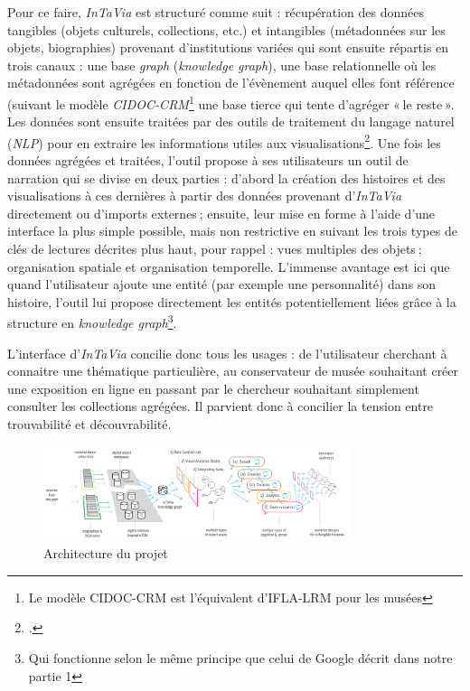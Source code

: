 Pour ce faire, \textit{InTaVia} est structuré comme suit : récupération des données tangibles (objets culturels, collections, etc.) et intangibles (métadonnées sur les objets, biographies) provenant d’institutions variées qui sont ensuite répartis en trois canaux : une base \textit{graph} (\textit{knowledge graph}), une base relationnelle où les métadonnées sont agrégées en fonction de l’évènement auquel elles font référence (suivant le modèle \textit{CIDOC-CRM}\footnote{Le modèle CIDOC-CRM est l'équivalent d'IFLA-LRM pour les musées} une base tierce qui tente d’agréger « le reste ». Les données sont ensuite traitées par des outils de traitement du langage naturel (\textit{NLP}) pour en extraire les informations utiles aux visualisations\footcite{noauthor_overall_nodate}. Une fois les données agrégées et traitées, l’outil propose à ses utilisateurs un outil de narration qui se divise en deux parties : d’abord la création des histoires et des visualisations à ces dernières à partir des données provenant d’\textit{InTaVia} directement ou d’imports externes ; ensuite, leur mise en forme à l’aide d’une interface la plus simple possible, mais non restrictive en suivant les trois types de clés de lectures décrites plus haut, pour rappel : vues multiples des objets ; organisation spatiale et organisation temporelle. L’immense avantage est ici que quand l’utilisateur ajoute une entité (par exemple une personnalité) dans son histoire, l’outil lui propose directement les entités potentiellement liées grâce à la structure en \textit{knowledge graph}\footnote{Qui fonctionne selon le même principe que celui de Google décrit dans notre partie 1}.

L’interface d’\textit{InTaVia} concilie donc tous les usages : de l’utilisateur cherchant à connaitre une thématique particulière, au conservateur de musée souhaitant créer une exposition en ligne en passant par le chercheur souhaitant simplement consulter les collections agrégées. Il parvient donc à concilier la tension entre trouvabilité et découvrabilité.


\begin{figure}[h!]
	\centering
	\includegraphics[width=0.8\textwidth]{images/image18.png}
	\caption{Architecture du projet}
	\label{fig:image18}
\end{figure}


